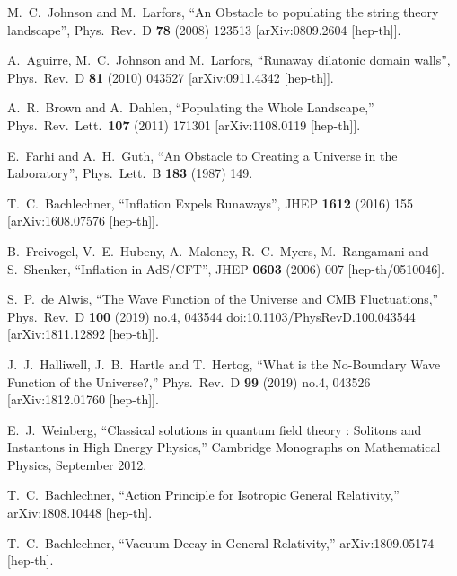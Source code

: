 \documentclass[11pt,a4paper]{article}
\begin{document}
\begin{thebibliography}{99}
  M.~C.~Johnson and M.~Larfors,
  ``An Obstacle to populating the string theory landscape'',
  Phys.\ Rev.\ D {\bf 78} (2008) 123513
  [arXiv:0809.2604 [hep-th]].
  
  A.~Aguirre, M.~C.~Johnson and M.~Larfors,
  ``Runaway dilatonic domain walls'',
  Phys.\ Rev.\ D {\bf 81} (2010) 043527
  [arXiv:0911.4342 [hep-th]].
  
  A.~R.~Brown and A.~Dahlen,
  ``Populating the Whole Landscape,''
  Phys.\ Rev.\ Lett.\  {\bf 107} (2011) 171301
  [arXiv:1108.0119 [hep-th]].
  
  E.~Farhi and A.~H.~Guth,
  ``An Obstacle to Creating a Universe in the Laboratory'',
  Phys.\ Lett.\ B {\bf 183} (1987) 149.
 
  
  T.~C.~Bachlechner,
  ``Inflation Expels Runaways'',
  JHEP {\bf 1612} (2016) 155
  [arXiv:1608.07576 [hep-th]].

  B.~Freivogel, V.~E.~Hubeny, A.~Maloney, R.~C.~Myers, M.~Rangamani and S.~Shenker,
  ``Inflation in AdS/CFT'',
  JHEP {\bf 0603} (2006) 007
  [hep-th/0510046].
  
  S.~P.~de Alwis,
  ``The Wave Function of the Universe and CMB Fluctuations,''
  Phys.\ Rev.\ D {\bf 100} (2019) no.4,  043544
  doi:10.1103/PhysRevD.100.043544
  [arXiv:1811.12892 [hep-th]].


  J.~J.~Halliwell, J.~B.~Hartle and T.~Hertog,
  ``What is the No-Boundary Wave Function of the Universe?,''
  Phys.\ Rev.\ D {\bf 99} (2019) no.4,  043526
  [arXiv:1812.01760 [hep-th]].
  
  E.~J.~Weinberg,
  ``Classical solutions in quantum field theory : Solitons and Instantons in High Energy Physics,''
  Cambridge Monographs on Mathematical Physics,
  September 2012.
  
  T.~C.~Bachlechner,
  ``Action Principle for Isotropic General Relativity,''
  arXiv:1808.10448 [hep-th].
  
  T.~C.~Bachlechner,
  ``Vacuum Decay in General Relativity,''
  arXiv:1809.05174 [hep-th].


\end{thebibliography}
\end{document}
